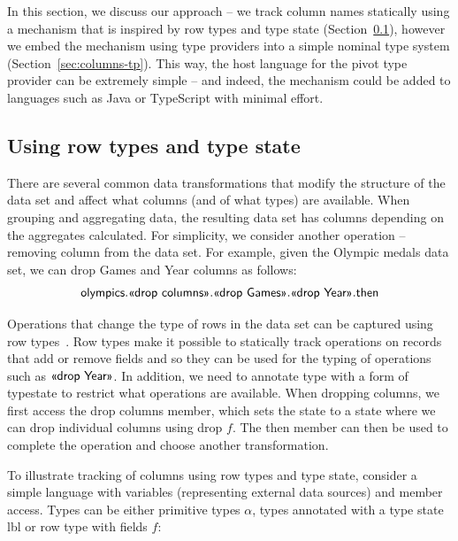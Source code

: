 \documentclass[a4paper,UKenglish]{lipics-v2016}
\theoremstyle{plain}
\theoremstyle{definition}
\newcommand{\ident}[1]{\textnormal{\sffamily #1}}
\newcommand{\qident}[1]{\textnormal{\sffamily \guillemotleft #1\guillemotright}}
\begin{document}
In this section, we discuss our approach -- we track column names statically using a mechanism
that is inspired by row types and type state (Section~\ref{sec:columns-row}), however we 
embed the mechanism using type providers into a simple nominal type system (Section~\ref{sec:columns-tp}).
This way, the host language for the pivot type provider can be extremely simple -- and indeed, the
mechanism could be added to languages such as Java or TypeScript with minimal effort. 


\subsection{Using row types and type state}
\label{sec:columns-row}

There are several common data transformations that modify the structure of the data set and affect
what columns (and of what types) are available. When grouping and aggregating data, the resulting
data set has columns depending on the aggregates calculated. For simplicity, we consider another 
operation -- removing column from the data set. For example, given the Olympic medals data set, we 
can drop \ident{Games} and \ident{Year} columns as follows:
%
\begin{equation*}
  \begin{array}{l}
    \ident{olympics}.\qident{drop columns}.\qident{drop Games}.\qident{drop Year}.\ident{then}
  \end{array}
\end{equation*}

\noindent
Operations that change the type of rows in the data set can be captured using row types~\cite{rowtypes}. 
Row types make it possible to statically track operations on records that add or remove fields
and so they can be used for the typing of operations such as $\qident{drop Year}$.
In addition, we need to annotate type with a form of typestate \cite{typestate} to restrict what operations are available. 
When dropping columns, we first access the \qident{drop columns} member, which sets the state to
a state where we can drop individual columns using \qident{drop $f$}. The \ident{then} member can 
then be used to complete the operation and choose another transformation.

To illustrate tracking of columns using row types and type state, consider a simple language with
variables (representing external data sources) and member access. Types can be either primitive 
types $\alpha$, types annotated with a type state \ident{lbl} or row type with fields $f$:
\end{document}
